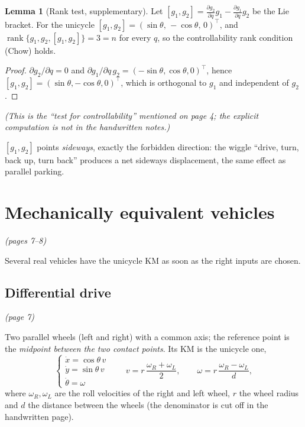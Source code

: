 \documentclass[11pt,a4paper]{article}
\DeclareMathOperator{\rank}{rank}
\theoremstyle{definition}
\newtheorem{lemma}[theorem]{Lemma}
\begin{document}
\begin{lemma}[Rank test, supplementary]\label{rem:chow}
Let $[g_1,g_2]=\frac{\partial g_2}{\partial q}g_1-\frac{\partial g_1}{\partial q}g_2$ be the Lie bracket. For the unicycle $[g_1,g_2]=(\sin\theta,\,-\cos\theta,\,0)^{\!\top}$, and $\rank\{g_1,g_2,[g_1,g_2]\}=3=n$ for every $q$, so the controllability rank condition (Chow) holds.
\end{lemma}
\begin{proof}
$\partial g_2/\partial q=0$ and $\partial g_1/\partial q\,g_2=(-\sin\theta,\cos\theta,0)^{\!\top}$, hence $[g_1,g_2]=(\sin\theta,-\cos\theta,0)^{\!\top}$, which is orthogonal to $g_1$ and independent of $g_2$.
\end{proof}
\noindent\emph{(This is the ``test for controllability'' mentioned on page 4; the explicit computation is not in the handwritten notes.)}

\begin{intuition}
$[g_1,g_2]$ points \emph{sideways}, exactly the forbidden direction: the wiggle ``drive, turn, back up, turn back'' produces a net sideways displacement, the same effect as parallel parking.
\end{intuition}

\section{Mechanically equivalent vehicles}\emph{(pages 7--8)}

Several real vehicles have the unicycle KM as soon as the right inputs are chosen.

\subsection{Differential drive}\emph{(page 7)}

Two parallel wheels (left and right) with a common axis; the reference point is the \emph{midpoint between the two contact points}. Its KM is the unicycle one,
\[
\begin{cases}\dot x=\cos\theta\,v\\ \dot y=\sin\theta\,v\\ \dot\theta=\omega\end{cases}
\qquad
v=r\,\frac{\omega_R+\omega_L}{2},\qquad \omega=r\,\frac{\omega_R-\omega_L}{d},
\]
where $\omega_R,\omega_L$ are the roll velocities of the right and left wheel, $r$ the wheel radius and $d$ the distance between the wheels (the denominator is cut off in the handwritten page).
\end{document}
